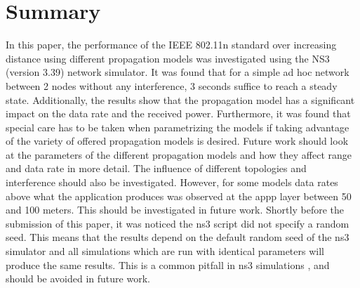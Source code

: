 \section{Summary}
\label{ch:summary}

In this paper, the performance of the IEEE 802.11n standard over 
increasing distance using different propagation models was investigated using the NS3 (version 3.39) network simulator.
It was found that for a simple ad hoc network between 2 nodes without any interference, 
3 seconds suffice to reach a steady state. 
Additionally, the results show that the propagation model has a significant impact on the data rate and the received power.
Furthermore, it was found that special care has to be taken when parametrizing the models if taking 
advantage of the variety of offered propagation models is desired.
Future work should look at the parameters of the different propagation models and how they affect 
range and data rate in more detail. The influence of different topologies and interference should also be investigated.
However, for some models data rates above what the application produces was observed at the appp layer  between 50 and 100 meters. This should be 
investigated in future work.
Shortly before the submission of this paper, it was noticed the ns3 script did not specify a random seed. 
This means that the results depend on the default random seed of the ns3 simulator and all simulations 
which are run with identical parameters will produce the same results. This is a common pitfall in ns3 simulations \cite{10.1145/1096166.1096174},
and should be avoided in future work. 